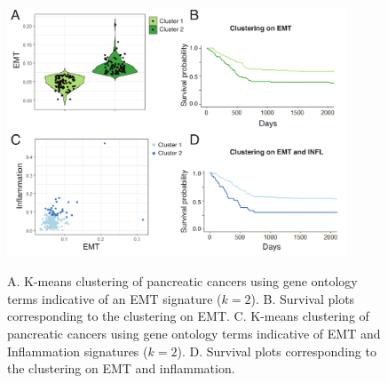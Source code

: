 \documentclass[11pt]{article}
\begin{document}
\begin{figure}
\center
{\includegraphics[width=0.9\textwidth]{FigTCGA.pdf}}
\caption{A. K-means clustering of pancreatic cancers using gene ontology terms indicative of an EMT signature ($k=2$). B. Survival plots corresponding to the clustering on EMT. C. K-means clustering of pancreatic cancers using gene ontology terms indicative of EMT and Inflammation signatures ($k=2$). D. Survival plots corresponding to the clustering on EMT and inflammation.}
\label{fig:tcga}
\end{figure}

\end{document}
